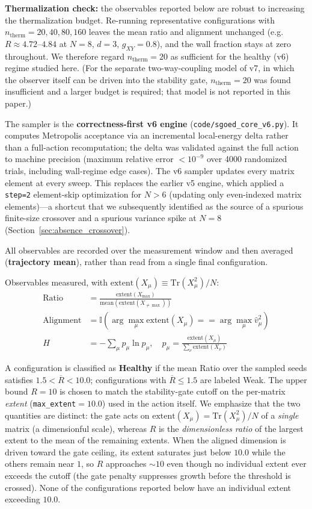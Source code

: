 \documentclass[12pt,a4paper]{article}
\begin{document}
\textbf{Thermalization check:} the observables reported below are robust to
increasing the thermalization budget. Re-running representative configurations
with $n_{\mathrm{therm}} = 20, 40, 80, 160$ leaves the mean ratio and
alignment unchanged (e.g.\ $R \approx 4.72$--$4.84$ at $N=8$, $d=3$,
$g_{XY}=0.8$), and the wall fraction stays at zero throughout. We therefore
regard $n_{\mathrm{therm}} = 20$ as sufficient for the healthy (v6) regime
studied here. (For the separate two-way-coupling model of v7, in which the
observer itself can be driven into the stability gate, $n_{\mathrm{therm}}=20$
was found insufficient and a larger budget is required; that model is not
reported in this paper.)

The sampler is the \textbf{correctness-first v6 engine}
(\texttt{code/sgoed\_core\_v6.py}). It computes Metropolis acceptance via an
incremental local-energy delta rather than a full-action recomputation; the
delta was validated against the full action to machine precision (maximum
relative error $< 10^{-9}$ over 4000 randomized trials, including wall-regime
edge cases). The v6 sampler updates every matrix element at every sweep. This
replaces the earlier v5 engine, which applied a \texttt{step=2} element-skip
optimization for $N>6$ (updating only even-indexed matrix elements)---a
shortcut that we subsequently identified as the source of a spurious
finite-size crossover and a spurious variance spike at $N=8$ (Section~\ref{sec:absence_crossover}).

All observables are recorded over the measurement window and then averaged
(\textbf{trajectory mean}), rather than read from a single final
configuration.

Observables measured, with $\text{extent}(X_\mu) \equiv \text{Tr}(X_\mu^2)/N$:
\begin{align}
\text{Ratio} &= \frac{\text{extent}(X_{\max})}{\text{mean}(\text{extent}(X_{\neq \max}))} \\
\text{Alignment} &= \mathbb{I}(\arg\max_\mu \text{extent}(X_\mu) == \arg\max_\mu \hat{v}_\mu^2) \\
H &= -\sum_\mu p_\mu \ln p_\mu, \quad p_\mu = \frac{\text{extent}(X_\mu)}{\sum_\nu \text{extent}(X_\nu)}
\end{align}

A configuration is classified as \textbf{Healthy} if the mean Ratio over
the sampled seeds satisfies $1.5 < \overline{R} < 10.0$; configurations with
$\overline{R} \leq 1.5$ are labeled Weak. The upper bound $R=10$ is chosen to
match the stability-gate cutoff on the per-matrix \emph{extent}
(\texttt{max\_extent}$=10.0$) used in the action itself. We emphasize that
the two quantities are distinct: the gate acts on $\text{extent}(X_\mu) =
\text{Tr}(X_\mu^2)/N$ of a \emph{single} matrix (a dimensionful scale), whereas
$R$ is the \emph{dimensionless ratio} of the largest extent to the mean of the
remaining extents. When the aligned dimension is driven toward the gate
ceiling, its extent saturates just below $10.0$ while the others remain near
$1$, so $R$ approaches $\sim 10$ even though no individual extent ever exceeds
the cutoff (the gate penalty suppresses growth before the threshold is
crossed). None of the configurations reported below have an individual extent
exceeding $10.0$.
\end{document}
